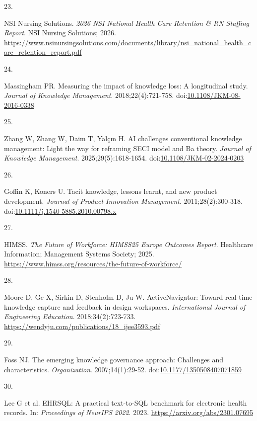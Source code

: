 \documentclass[
  american,
  11pt,
  letterpaper,
  oneside  ,captions=tableheading
]{scrartcl}
\newlength{\cslhangindent}
\newlength{\csllabelwidth}
\newenvironment{CSLReferences}[2] %
 {\begin{list}{}{%
  \setlength{\itemindent}{0pt}
  \setlength{\leftmargin}{0pt}
  \setlength{\parsep}{0pt}
  \ifodd #1
   \setlength{\leftmargin}{\cslhangindent}
   \setlength{\itemindent}{-1\cslhangindent}
  \fi
  \setlength{\itemsep}{#2\baselineskip}}}
 {\end{list}}
\newcommand{\CSLLeftMargin}[1]{\parbox[t]{\csllabelwidth}{\strut#1\strut}}
\newcommand{\CSLRightInline}[1]{\parbox[t]{\linewidth - \csllabelwidth}{\strut#1\strut}}
\begin{document}
\begin{CSLReferences}{0}{1}
\CSLLeftMargin{23. }%
\CSLRightInline{NSI Nursing Solutions. \emph{{2026 NSI National Health
Care Retention \& RN Staffing Report}}. NSI Nursing Solutions; 2026.
\url{https://www.nsinursingsolutions.com/documents/library/nsi_national_health_care_retention_report.pdf}}

\CSLLeftMargin{24. }%
\CSLRightInline{Massingham PR. {Measuring the impact of knowledge loss:
A longitudinal study}. \emph{Journal of Knowledge Management}.
2018;22(4):721-758.
doi:\href{https://doi.org/10.1108/JKM-08-2016-0338}{10.1108/JKM-08-2016-0338}}

\CSLLeftMargin{25. }%
\CSLRightInline{Zhang W, Zhang W, Daim T, Yalçın H. {{AI} challenges
conventional knowledge management: Light the way for reframing {SECI}
model and Ba theory}. \emph{Journal of Knowledge Management}.
2025;29(5):1618-1654.
doi:\href{https://doi.org/10.1108/JKM-02-2024-0203}{10.1108/JKM-02-2024-0203}}

\CSLLeftMargin{26. }%
\CSLRightInline{Goffin K, Koners U. {Tacit knowledge, lessons learnt,
and new product development}. \emph{Journal of Product Innovation
Management}. 2011;28(2):300-318.
doi:\href{https://doi.org/10.1111/j.1540-5885.2010.00798.x}{10.1111/j.1540-5885.2010.00798.x}}

\CSLLeftMargin{27. }%
\CSLRightInline{HIMSS. \emph{{The Future of Workforce: HIMSS25 Europe
Outcomes Report}}. Healthcare Information; Management Systems Society;
2025. \url{https://www.himss.org/resources/the-future-of-workforce/}}

\CSLLeftMargin{28. }%
\CSLRightInline{Moore D, Ge X, Sirkin D, Stenholm D, Ju W.
{ActiveNavigator: Toward real-time knowledge capture and feedback in
design workspaces}. \emph{International Journal of Engineering
Education}. 2018;34(2):723-733.
\url{https://wendyju.com/publications/18_ijee3593.pdf}}

\CSLLeftMargin{29. }%
\CSLRightInline{Foss NJ. {The emerging knowledge governance approach:
Challenges and characteristics}. \emph{Organization}. 2007;14(1):29-52.
doi:\href{https://doi.org/10.1177/1350508407071859}{10.1177/1350508407071859}}

\CSLLeftMargin{30. }%
\CSLRightInline{{Lee G et al.} {EHRSQL: A practical text-to-SQL
benchmark for electronic health records}. In: \emph{Proceedings of
NeurIPS 2022}. 2023. \url{https://arxiv.org/abs/2301.07695}}


\end{CSLReferences}
\end{document}
